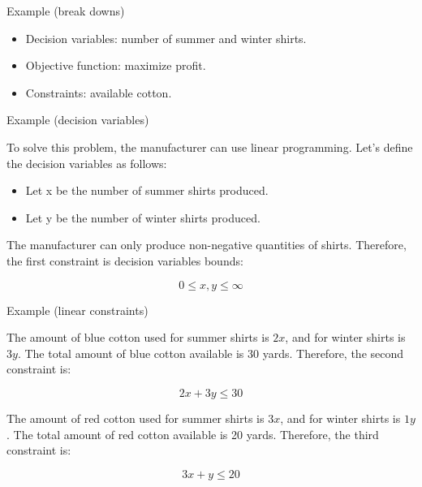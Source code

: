 \documentclass{beamer}
\begin{document}
\begin{frame}{Example (break downs)}

    \begin{itemize}
        \item Decision variables: number of summer and winter shirts.
        \item Objective function: maximize profit.
        \item Constraints: available cotton.
    \end{itemize}

\end{frame}

\begin{frame}{Example (decision variables)}

    To solve this problem, the manufacturer can use linear programming. Let's define the decision variables as follows:
    \begin{itemize}
        \item Let x be the number of summer shirts produced.
        \item Let y be the number of winter shirts produced.
    \end{itemize}

    The manufacturer can only produce non-negative quantities of shirts. Therefore, the first constraint is decision variables bounds:

    \begin{equation}
        0 \leq x, y \leq \infty
    \end{equation}

\end{frame}

\begin{frame}{Example (linear constraints)}

    The amount of blue cotton used for summer shirts is $2x$, and for winter shirts is $3y$. The total amount of blue cotton available is 30 yards. Therefore, the second constraint is:

    \begin{equation}
        2x + 3y \leq 30
    \end{equation}

    The amount of red cotton used for summer shirts is $3x$, and for winter shirts is $1y$. The total amount of red cotton available is 20 yards. Therefore, the third constraint is:

    \begin{equation}
        3x + y \leq 20
    \end{equation}

\end{frame}
\end{document}
